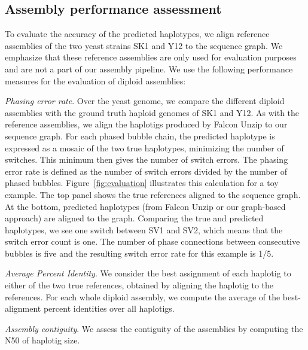 \subsection{Assembly performance assessment}
To evaluate the accuracy of the predicted haplotypes, we align reference assemblies of the two yeast strains SK1 and Y12 \citep{yue2017contrasting} to the sequence graph.
We emphasize that these reference assemblies are only used for evaluation purposes and are not a part of our assembly pipeline.
We use the following performance measures for the evaluation of diploid assemblies:

\textit{Phasing error rate}. Over the yeast genome, we compare the different diploid assemblies with the ground truth haploid genomes of SK1 and Y12.
As with the reference assemblies, we align the haplotigs produced by Falcon Unzip to our sequence graph.
For each phased bubble chain, the predicted haplotype is expressed as a mosaic of the two true haplotypes, minimizing the number of switches. 
This minimum then gives the number of switch errors.
The phasing error rate is defined as the number of switch errors divided by the number of phased bubbles.
Figure~\ref{fig:evaluation} illustrates this calculation for a toy example.  The top panel shows the true references aligned to the sequence graph. At the bottom, predicted haplotypes (from Falcon Unzip or our graph-based approach) are aligned to the graph.
Comparing the true and predicted haplotypes, we see one switch between SV1 and SV2, which means that the switch error count is one. 
The number of phase connections between consecutive bubbles is five and the resulting switch error rate for this example is 1/5.

\textit{Average Percent Identity}. We consider the best assignment of each haplotig to either of the two true references, obtained by aligning the haplotig to the references.
For each whole diploid assembly, we compute the average of the best-alignment percent identities over all haplotigs. 

\textit{Assembly contiguity}. We assess the contiguity of the assemblies by computing the N50 of haplotig size.

